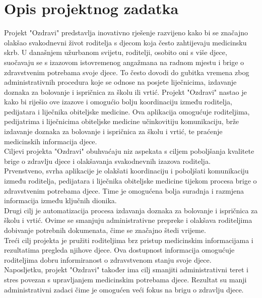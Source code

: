 \chapter{Opis projektnog zadatka}  
    Projekt "Ozdravi" predstavlja inovativno rješenje razvijeno kako bi se značajno olakšao svakodnevni život roditelja s djecom koja često zahtijevaju medicinsku skrb. U današnjem užurbanom svijetu, roditelji, osobito oni s više djece, suočavaju se s izazovom istovremenog angažmana na radnom mjestu i brige o zdravstvenim potrebama svoje djece. To često dovodi do gubitka vremena zbog administrativnih procedura koje se odnose na posjete liječnicima, izdavanje doznaka za bolovanje i ispričnica za školu ili vrtić. 
    Projekt "Ozdravi" nastao je kako bi riješio ove izazove i omogućio bolju koordinaciju između roditelja, pedijatara i liječnika obiteljske medicine. 
    Ova aplikacija omogućuje roditeljima, pedijatrima i liječnicima obiteljske medicine učinkovitiju komunikaciju, brže izdavanje doznaka za bolovanje i ispričnica za školu i vrtić, te praćenje medicinskih informacija djece.\\

Ciljevi projekta "Ozdravi" obuhvaćaju niz aspekata s ciljem poboljšanja kvalitete brige o zdravlju djece i olakšavanja svakodnevnih izazova roditelja. \\

Prvenstveno, svrha aplikacije je olakšati koordinaciju i poboljšati komunikaciju između roditelja, pedijatara i liječnika obiteljske medicine tijekom procesa brige o zdravstvenim potrebama djece. Time je omogućena bolja suradnja i razmjena informacija između ključnih dionika. \\

Drugi cilj je automatizacija procesa izdavanja doznaka za bolovanje i ispričnica za školu i vrtić. Ovime se smanjuju administrativne prepreke i olakšava roditeljima dobivanje potrebnih dokumenata, čime se značajno štedi vrijeme.
\\

Treći cilj projekta je pružiti roditeljima brz pristup medicinskim informacijama i rezultatima pregleda njihove djece. Ova dostupnost informacija omogućuje roditeljima dobru informiranost o zdravstvenom stanju svoje djece.
\\
Naposljetku, projekt "Ozdravi" također ima cilj smanjiti administrativni teret i stres povezan s upravljanjem medicinskim potrebama djece. Rezultat su manji administrativni zadaci čime je omogućen veći fokus na brigu o zdravlju djece. \\


